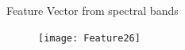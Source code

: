 \begin{frame}{Feature Vector from spectral bands}
\begin{figure}
\texttt{[image: Feature26]}
\end{figure}
\end{frame}


%
%
